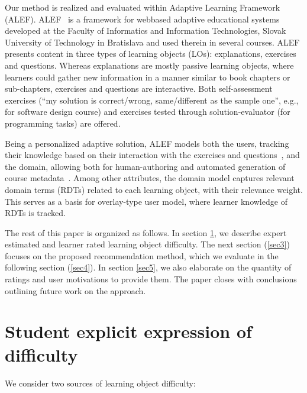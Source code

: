 \documentclass{llncs}
\begin{document}
Our method is realized and evaluated within Adaptive Learning Framework (ALEF). ALEF~\cite{6.} is a framework for webbased adaptive educational systems developed at the Faculty of Informatics and Information Technologies, Slovak University of Technology in Bratislava and used therein in several courses. ALEF presents content in three types of learning objects (LOs): explanations, exercises and questions. Whereas explanations are mostly passive learning objects, where learners could gather new information in a manner similar to book chapters or sub-chapters, exercises and questions are interactive. Both self-assessment exercises (``my solution is correct/wrong, same/different as the sample one'', e.g., for software design course) and exercises tested through solution-evaluator (for programming tasks) are offered.

Being a personalized adaptive solution, ALEF models both the users, tracking their knowledge based on their interaction with the exercises and questions~\cite{7.}, and the domain, allowing both for human-authoring and automated generation of course metadata~\cite{8.}. Among other attributes, the domain model captures relevant domain terms (RDTs) related to each learning object, with their relevance weight. This serves as a basis for overlay-type user model, where learner knowledge of RDTs is tracked.

The rest of this paper is organized as follows. In section \ref{sec2}, we describe expert estimated and learner rated learning object difficulty. The next section (\ref{sec3}) focuses on the proposed recommendation method, which we evaluate in the following section (\ref{sec4}). In section \ref{sec5}, we also elaborate on the quantity of ratings and user motivations to provide them. The paper closes with conclusions outlining future work on the approach.

\section{Student explicit expression of difficulty}
\label{sec2}

We consider two sources of learning object difficulty:
\end{document}
